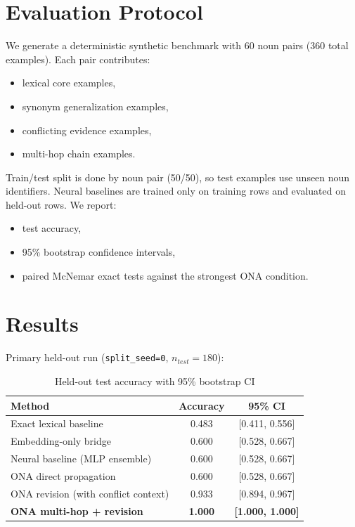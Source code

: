 \documentclass{article}
\begin{document}
\section{Evaluation Protocol}
We generate a deterministic synthetic benchmark with 60 noun pairs ($360$ total examples). Each pair contributes:
\begin{itemize}
    \item lexical core examples,
    \item synonym generalization examples,
    \item conflicting evidence examples,
    \item multi-hop chain examples.
\end{itemize}

Train/test split is done by noun pair (50/50), so test examples use unseen noun identifiers. Neural baselines are trained only on training rows and evaluated on held-out rows. We report:
\begin{itemize}
    \item test accuracy,
    \item 95\% bootstrap confidence intervals,
    \item paired McNemar exact tests against the strongest ONA condition.
\end{itemize}

\section{Results}
Primary held-out run (\texttt{split\_seed=0}, $n_{test}=180$):

\begin{table}[h]
\centering
\caption{Held-out test accuracy with 95\% bootstrap CI}
\begin{tabular}{lcc}
\toprule
Method & Accuracy & 95\% CI \\
\midrule
Exact lexical baseline & 0.483 & [0.411, 0.556] \\
Embedding-only bridge & 0.600 & [0.528, 0.667] \\
Neural baseline (MLP ensemble) & 0.600 & [0.528, 0.667] \\
ONA direct propagation & 0.600 & [0.528, 0.667] \\
ONA revision (with conflict context) & 0.933 & [0.894, 0.967] \\
\textbf{ONA multi-hop + revision} & \textbf{1.000} & \textbf{[1.000, 1.000]} \\
\bottomrule
\end{tabular}
\end{table}
\end{document}

